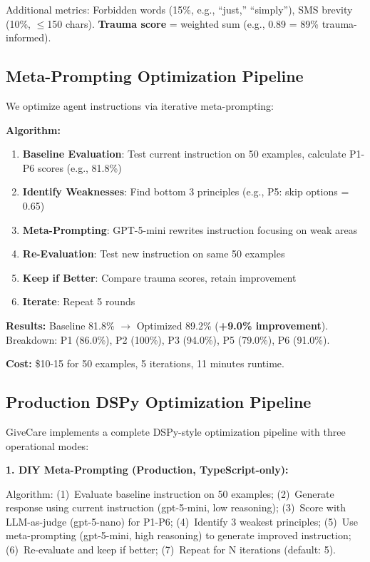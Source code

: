 \documentclass{article}%
\begin{document}
Additional metrics: Forbidden words (15\%, e.g., ``just,'' ``simply''), SMS brevity (10\%, $\leq$150 chars). \textbf{Trauma score} = weighted sum (e.g., 0.89 = 89\% trauma-informed).

%
\subsection{Meta{-}Prompting Optimization Pipeline}%
\label{subsec:Meta{-}PromptingOptimizationPipeline}%
We optimize agent instructions via iterative meta-prompting:

\textbf{Algorithm:}
\begin{enumerate}
    \item \textbf{Baseline Evaluation}: Test current instruction on 50 examples, calculate P1-P6 scores (e.g., 81.8\%)
    \item \textbf{Identify Weaknesses}: Find bottom 3 principles (e.g., P5: skip options = 0.65)
    \item \textbf{Meta-Prompting}: GPT-5-mini rewrites instruction focusing on weak areas
    \item \textbf{Re-Evaluation}: Test new instruction on same 50 examples
    \item \textbf{Keep if Better}: Compare trauma scores, retain improvement
    \item \textbf{Iterate}: Repeat 5 rounds
\end{enumerate}

\textbf{Results:} Baseline 81.8\% $\rightarrow$ Optimized 89.2\% (\textbf{+9.0\% improvement}). Breakdown: P1 (86.0\%), P2 (100\%), P3 (94.0\%), P5 (79.0\%), P6 (91.0\%).

\textbf{Cost:} \$10-15 for 50 examples, 5 iterations, 11 minutes runtime.

%
\subsection{Production DSPy Optimization Pipeline}%
\label{subsec:ProductionDSPyOptimizationPipeline}%
GiveCare implements a complete DSPy-style optimization pipeline with three operational modes:

\textbf{1. DIY Meta-Prompting (Production, TypeScript-only):}

Algorithm: (1)~Evaluate baseline instruction on 50 examples; (2)~Generate response using current instruction (gpt-5-mini, low reasoning); (3)~Score with LLM-as-judge (gpt-5-nano) for P1-P6; (4)~Identify 3 weakest principles; (5)~Use meta-prompting (gpt-5-mini, high reasoning) to generate improved instruction; (6)~Re-evaluate and keep if better; (7)~Repeat for N iterations (default: 5).
\end{document}
